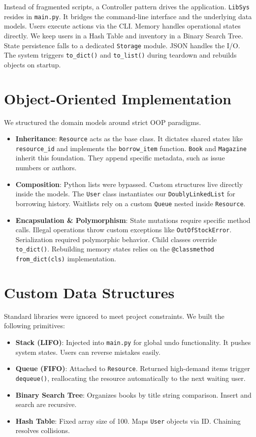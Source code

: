 \documentclass[11pt,a4paper]{article}
\begin{document}
Instead of fragmented scripts, a Controller pattern drives the application. \texttt{LibSys} resides in \texttt{main.py}. It bridges the command-line interface and the underlying data models. Users execute actions via the CLI. Memory handles operational states directly. We keep users in a Hash Table and inventory in a Binary Search Tree. State persistence falls to a dedicated \texttt{Storage} module. JSON handles the I/O. The system triggers \texttt{to\_dict()} and \texttt{to\_list()} during teardown and rebuilds objects on startup.

\section{Object-Oriented Implementation}
We structured the domain models around strict OOP paradigms.

\begin{itemize}
    \item \textbf{Inheritance}: \texttt{Resource} acts as the base class. It dictates shared states like \texttt{resource\_id} and implements the \texttt{borrow\_item} function. \texttt{Book} and \texttt{Magazine} inherit this foundation. They append specific metadata, such as issue numbers or authors.
    \item \textbf{Composition}: Python lists were bypassed. Custom structures live directly inside the models. The \texttt{User} class instantiates our \texttt{DoublyLinkedList} for borrowing history. Waitlists rely on a custom \texttt{Queue} nested inside \texttt{Resource}.
    \item \textbf{Encapsulation \& Polymorphism}: State mutations require specific method calls. Illegal operations throw custom exceptions like \texttt{OutOfStockError}. Serialization required polymorphic behavior. Child classes override \texttt{to\_dict()}. Rebuilding memory states relies on the \texttt{@classmethod from\_dict(cls)} implementation.
\end{itemize}

\section{Custom Data Structures}
Standard libraries were ignored to meet project constraints. We built the following primitives:

\begin{itemize}
    \item \textbf{Stack (LIFO)}: Injected into \texttt{main.py} for global undo functionality. It pushes system states. Users can reverse mistakes easily.
    \item \textbf{Queue (FIFO)}: Attached to \texttt{Resource}. Returned high-demand items trigger \texttt{dequeue()}, reallocating the resource automatically to the next waiting user.
    \item \textbf{Binary Search Tree}: Organizes books by title string comparison. Insert and search are recursive.
    \item \textbf{Hash Table}: Fixed array size of 100. Maps \texttt{User} objects via ID. Chaining resolves collisions.
\end{itemize}
\end{document}
